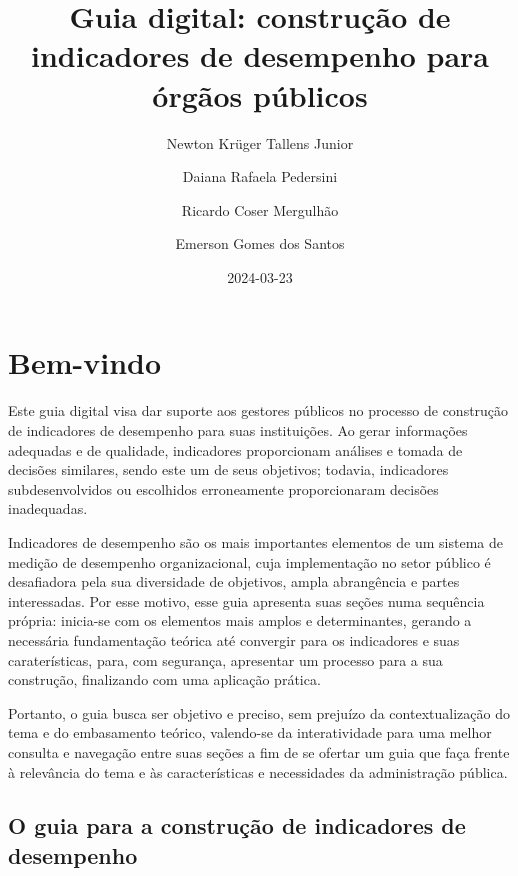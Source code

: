 \documentclass[
  letterpaper,
  DIV=11,
  numbers=noendperiod]{scrreprt}
\title{Guia digital: construção de indicadores de desempenho para órgãos
públicos}
\author{Newton Krüger Tallens Junior \and Daiana Rafaela
Pedersini \and Ricardo Coser Mergulhão \and Emerson Gomes dos Santos}
\date{2024-03-23}
\renewcommand*\contentsname{Índice}
\newcommand\contentsname{Índice}
\begin{document}
\maketitle
\ifdefined\Shaded\renewenvironment{Shaded}{\begin{tcolorbox}[enhanced, frame hidden, sharp corners, interior hidden, breakable, borderline west={3pt}{0pt}{shadecolor}, boxrule=0pt]}{\end{tcolorbox}}\fi

\renewcommand*\contentsname{Índice}
{
\hypersetup{linkcolor=}
\setcounter{tocdepth}{2}
\tableofcontents
}

\hypertarget{bem-vindo}{%
\chapter*{Bem-vindo}\label{bem-vindo}}


Este guia digital visa dar suporte aos gestores públicos no processo de
construção de indicadores de desempenho para suas instituições. Ao gerar
informações adequadas e de qualidade, indicadores proporcionam análises
e tomada de decisões similares, sendo este um de seus objetivos;
todavia, indicadores subdesenvolvidos ou escolhidos erroneamente
proporcionaram decisões inadequadas.

Indicadores de desempenho são os mais importantes elementos de um
sistema de medição de desempenho organizacional, cuja implementação no
setor público é desafiadora pela sua diversidade de objetivos, ampla
abrangência e partes interessadas. Por esse motivo, esse guia apresenta
suas seções numa sequência própria: inicia-se com os elementos mais
amplos e determinantes, gerando a necessária fundamentação teórica até
convergir para os indicadores e suas caraterísticas, para, com
segurança, apresentar um processo para a sua construção, finalizando com
uma aplicação prática.

Portanto, o guia busca ser objetivo e preciso, sem prejuízo da
contextualização do tema e do embasamento teórico, valendo-se da
interatividade para uma melhor consulta e navegação entre suas seções a
fim de se ofertar um guia que faça frente à relevância do tema e às
características e necessidades da administração pública.

\hypertarget{o-guia-para-a-construuxe7uxe3o-de-indicadores-de-desempenho}{%
\section*{O guia para a construção de indicadores de
desempenho}\label{o-guia-para-a-construuxe7uxe3o-de-indicadores-de-desempenho}}
\end{document}
